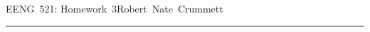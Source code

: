 


\def\qed{\vrule height 6pt width 6pt depth 0pt}
\parindent 0pt
\parskip 2mm


EENG~521: Homework~3\hfill Robert~Nate~Crummett
\smallskip
\hrule






\bye
